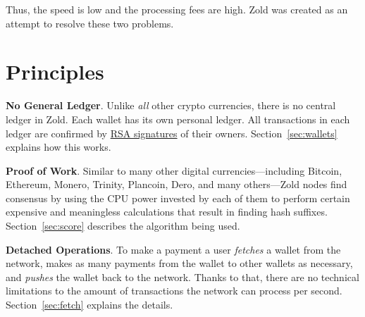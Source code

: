 \documentclass{main}
\begin{document}
Thus, the speed is low and the processing fees are high.
Zold was created as an attempt to resolve these two problems.

\section{Principles}

\textbf{No General Ledger}.
Unlike \emph{all} other crypto currencies, there is no central ledger in Zold.
Each wallet has its own personal ledger.
All transactions in each ledger are confirmed by
\href{https://en.wikipedia.org/wiki/RSA_(cryptosystem)}{RSA signatures} of their owners.
Section~\ref{sec:wallets} explains how this works.

\textbf{Proof of Work}.
Similar to many other digital currencies---including Bitcoin, Ethereum, Monero, Trinity, Plancoin, Dero,
and many others---Zold nodes find consensus by using the CPU power invested
by each of them to perform certain expensive and meaningless calculations that result in finding hash suffixes.
Section~\ref{sec:score} describes the algorithm being used.

\textbf{Detached Operations}.
To make a payment a user \emph{fetches} a wallet from the network,
makes as many payments from the wallet to other wallets as necessary,
and \emph{pushes} the wallet back to the network.
Thanks to that, there are no technical limitations to
the amount of transactions the network can process per second.
Section~\ref{sec:fetch} explains the details.
\end{document}
